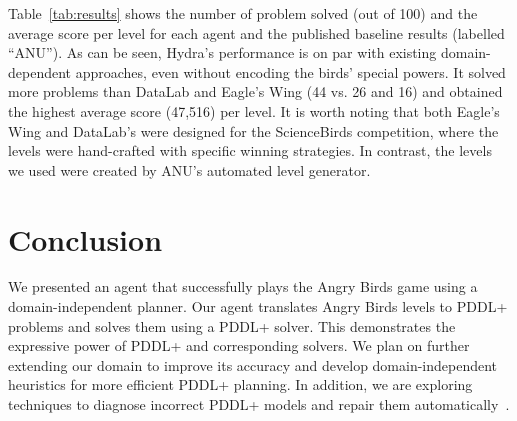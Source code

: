 \documentclass[letterpaper]{article} %
\begin{document}
Table~\ref{tab:results} shows the number of problem solved (out of 100) and the average score per level for each agent and the published baseline results (labelled ``ANU'').
As can be seen, Hydra's performance is on par with existing domain-dependent approaches, even without encoding the birds' special powers. It solved more problems than DataLab and Eagle's Wing (44 vs. 26 and 16) and obtained the highest average score (47,516) per level.
It is worth noting that both Eagle's Wing and DataLab's were designed for the ScienceBirds competition, where the levels were hand-crafted with specific winning strategies. In contrast, the levels we used were created by ANU's automated level generator.

















\vspace{-0.88mm}
\vspace{-1.54mm}
\section{Conclusion}




We presented an agent that successfully plays the Angry Birds game  using a domain-independent planner.
Our agent translates Angry Birds levels to PDDL+ problems and solves them using a PDDL+ solver.
This demonstrates the expressive power of PDDL+ and corresponding solvers.
We plan on further extending our domain to improve its accuracy and develop domain-independent heuristics for more efficient PDDL+ planning.
In addition, we are exploring techniques to diagnose incorrect PDDL+ models and repair them automatically~\cite{klenk2020model}.
\end{document}

